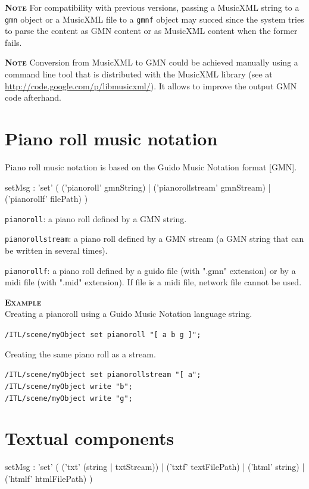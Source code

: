 \documentclass[a4paper,twoside]{report}
\newcommand{\sublevel}[1]	{\section{#1}}
\newcommand{\OSC}[1]		{\texttt{#1}}
\newcommand{\example}		{\textbf{\hspace{-1.5cm}\textbf{\textsc{Example }}}}
\newcommand{\note}	[1]		{\vspace{2mm}\textbf{\hspace{-1.03cm}\textbf{\textsc{Note #1}}}}
\let\olditemize\itemize
\let\oldenditemize\enditemize
\renewenvironment{itemize} 	{\olditemize \setlength{\itemsep}{1mm}}{\oldenditemize}
\newcommand{\sample}	[1]			{\vspace{-2mm}\begin{center}\colorbox{mygrey}{
								\begin{minipage}[t]{0.9\columnwidth} 
								{\small \texttt{#1}}
								\end{minipage}}\end{center}}
\begin{document}
\note{} For compatibility with previous versions, passing a MusicXML string to a \OSC{gmn} object or a MusicXML file to a \OSC{gmnf} object may succed since the system tries to parse the content as GMN content or as MusicXML content when the former fails.

\note{} Conversion from MusicXML to GMN could be achieved manually using a command line tool that is distributed with the MusicXML library (see at \url{http://code.google.com/p/libmusicxml/}). It allows to improve the output GMN code afterhand.

\sublevel{Piano roll music notation}
\label{pianorollscore}
Piano roll music notation is based on the Guido Music Notation format [GMN].

\begin{rail}
setMsg : 'set' (
	('pianoroll' gmnString) |
	('pianorollstream' gmnStream) |
	('pianorollf' filePath)
)
\end{rail}

\begin{itemize}
\item \OSC{pianoroll}: a piano roll defined by a GMN string.
\item \OSC{pianorollstream}: a piano roll defined by a GMN stream (a GMN string that can be written in several times).
\item \OSC{pianorollf}: a piano roll defined by a guido file (with ".gmn" extension) or by a midi file (with ".mid" extension). If file is a midi file, network file cannot be used.
\end{itemize}

\example \\
Creating a pianoroll using a Guido Music Notation language string.
\sample{/ITL/scene/myObject set pianoroll "[ a b g ]";}
Creating the same piano roll as a stream.
\sample{/ITL/scene/myObject set pianorollstream "[ a";\\
/ITL/scene/myObject write "b";\\
/ITL/scene/myObject write "g";
}

\sublevel{Textual components}
\label{textscore}

\begin{rail}
setMsg : 'set' (
	('txt' (string | txtStream)) |
	('txtf' textFilePath) |
	('html' string) |
	('htmlf' htmlFilePath)
)
\end{rail}
\end{document}
